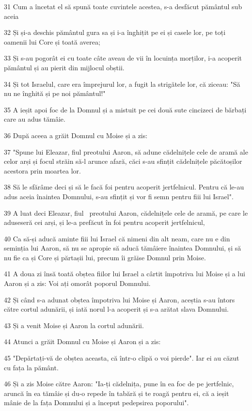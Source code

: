 \par 31 Cum a încetat el să spună toate cuvintele acestea, s-a desfăcut pământul sub aceia
\par 32 Și și-a deschis pământul gura sa și i-a înghițit pe ei și casele lor, pe toți oamenii lui Core și toată averea;
\par 33 Și s-au pogorât ei cu toate câte aveau de vii în locuința morților, i-a acoperit pământul și au pierit din mijlocul obștii.
\par 34 Și tot Israelul, care era împrejurul lor, a fugit la strigătele lor, că ziceau: "Să nu ne înghită și pe noi pământul!"
\par 35 A ieșit apoi foc de la Domnul și a mistuit pe cei două sute cincizeci de bărbați care au adus tămâie.
\par 36 După aceea a grăit Domnul cu Moise și a zis:
\par 37 "Spune lui Eleazar, fiul preotului Aaron, să adune cădelnițele cele de aramă ale celor arși și focul străin să-l arunce afară, căci s-au sfințit cădelnițele păcătoșilor acestora prin moartea lor.
\par 38 Să le sfărâme deci și să le facă foi pentru acoperit jertfelnicul. Pentru că le-au adus aceia înaintea Domnului, s-au sfințit și vor fi semn pentru fiii lui Israel".
\par 39 A luat deci Eleazar, fiul  preotului Aaron, cădelnițele cele de aramă, pe care le aduseseră cei arși, și le-a prefăcut în foi pentru acoperit jertfelnicul,
\par 40 Ca să-și aducă aminte fiii lui Israel că nimeni din alt neam, care nu e din seminția lui Aaron, să nu se apropie să aducă tămâiere înaintea Domnului, și să nu fie ca și Core și părtașii lui, precum îi grăise Domnul prin Moise.
\par 41 A doua zi însă toată obștea fiilor lui Israel a cârtit împotriva lui Moise și a lui Aaron și a zis: Voi ați omorât poporul Domnului.
\par 42 Și când s-a adunat obștea împotriva lui Moise și Aaron, aceștia s-au întors către cortul adunării, și iată norul l-a acoperit și s-a arătat slava Domnului.
\par 43 Și a venit Moise și Aaron la cortul adunării.
\par 44 Atunci a grăit Domnul cu Moise și Aaron și a zis:
\par 45 "Depărtați-vă de obștea aceasta, că într-o clipă o voi pierde". Iar ei au căzut cu fața la pământ.
\par 46 Și a zis Moise către Aaron: "Ia-ți cădelnița, pune în ea foc de pe jertfelnic, aruncă în ea tămâie și du-o repede în tabără și te roagă pentru ei, că a ieșit mânie de la fața Domnului și a început pedepsirea poporului".
